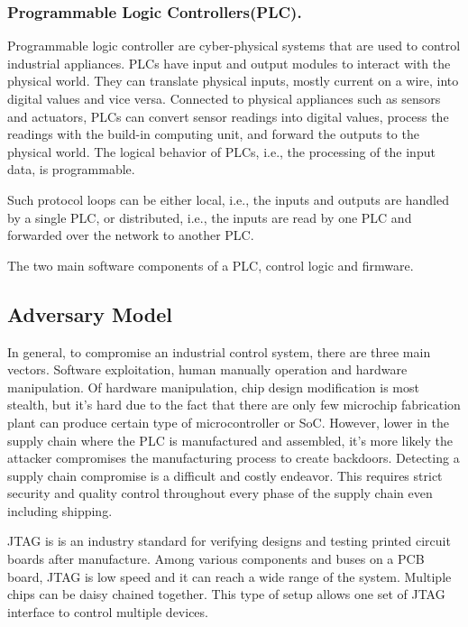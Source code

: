 \subsubsection{Programmable Logic Controllers(PLC).} Programmable logic controller are cyber-physical systems that are used to control industrial appliances. PLCs have input and output modules to interact with the physical world. They can translate physical inputs, mostly current on a wire, into digital values and vice versa. Connected to physical appliances such as sensors and actuators, PLCs can convert sensor readings into digital values, process the readings with the build-in computing unit, and forward the outputs to the physical world. The logical behavior of PLCs, i.e., the processing of the input data, is programmable.

Such protocol loops can be either local, i.e., the inputs and outputs are handled by a single PLC, or distributed, i.e., the inputs are read by one PLC and forwarded over the network to another PLC.

The two main software components of a PLC, control logic and firmware.






\subsection{Adversary Model}
In general, to compromise an industrial control system, there are three main vectors. Software exploitation, human manually operation and hardware manipulation. Of hardware manipulation, chip design modification is most stealth, but it's hard due to the fact that there are only few microchip fabrication plant can produce certain type of microcontroller or SoC. However, lower in the supply chain where the PLC is manufactured and assembled, it's more likely the attacker compromises the manufacturing process to create backdoors. Detecting a supply chain compromise is a difficult and costly endeavor. This requires strict security and quality control throughout every phase of the supply chain even including shipping.


JTAG is is an industry standard for verifying designs and testing printed circuit boards after manufacture. Among various components and buses on a PCB board, JTAG is low speed and it can reach a wide range of the system. Multiple chips can be daisy chained together. This type of setup allows one set of JTAG interface to control multiple devices.
